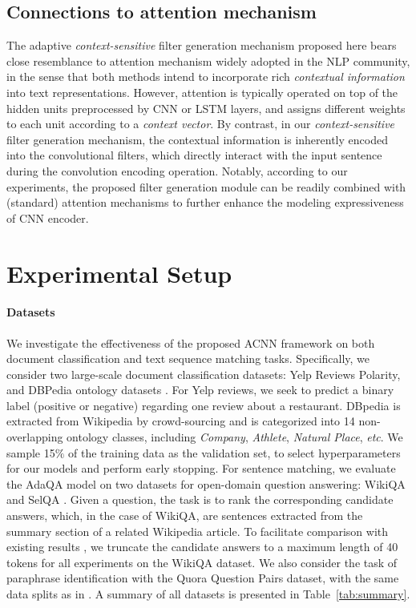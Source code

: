 \documentclass[11pt,a4paper]{article}
\begin{document}
\subsection{Connections to attention mechanism}
\label{sec:att}
The adaptive \emph{context-sensitive} filter generation mechanism proposed here bears close resemblance to attention mechanism \cite{yin2015abcnn, bahdanau2014neural, xiong2016dynamic} widely adopted in the NLP community, in the sense that both methods intend to incorporate rich \emph{contextual information} into text representations. However, attention is typically operated on top of the hidden units preprocessed by CNN or LSTM layers, and assigns different weights to each unit according to a \emph{context vector}. By contrast, in our \emph{context-sensitive} filter generation mechanism, the contextual information is inherently encoded into the convolutional filters, which directly interact with the input sentence during the convolution encoding operation. 
Notably, according to our experiments, the proposed filter generation module can be readily combined with (standard) attention mechanisms to further enhance the modeling expressiveness of CNN encoder.

\section{Experimental Setup}
\paragraph{Datasets}
We investigate the effectiveness of the proposed ACNN framework on both document classification and text sequence matching tasks. Specifically, we consider two large-scale document classification datasets: Yelp Reviews Polarity, and DBPedia ontology datasets \citep{zhang2015character}. For Yelp reviews, we seek to predict a binary label (positive or negative) regarding one review about a restaurant. DBpedia is extracted from Wikipedia by crowd-sourcing and is categorized into 14 non-overlapping ontology classes, including \emph{Company}, \emph{Athlete}, \emph{Natural Place}, \emph{etc}. We sample 15$\%$ of the training data as the validation set, to select hyperparameters for our models and perform early stopping. 
For sentence matching, we evaluate the AdaQA model on two datasets for open-domain question answering: WikiQA \citep{yang2015wikiqa} and SelQA \citep{jurczyk2016selqa}. Given a question, the task is to rank the corresponding candidate answers, which, in the case of WikiQA, are sentences extracted from the summary section of a related Wikipedia article. 
To facilitate comparison with existing results \citep{yin2015abcnn,yang2015wikiqa, Shen2018BaselineNM}, we truncate the candidate answers to a maximum length of 40 tokens for all experiments on the WikiQA dataset.
We also consider the task of paraphrase identification with the Quora Question Pairs dataset, with the same data splits as in \cite{wang2017bilateral}. 
A summary of all datasets is presented in Table~\ref{tab:summary}.
\end{document}
